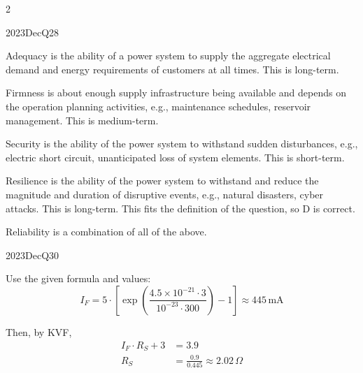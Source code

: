 \begin{multicols}{2}
\begin{qsolution}{2023}{Dec}{Q28}{\tgEE \tgEEPowerSystems}

    \begin{enumualpha}
        \item Adequacy is the ability of a power system to supply the aggregate electrical demand and energy requirements of customers at all times.
            This is long-term.
        \item Firmness is about enough supply infrastructure being available and depends on the operation planning activities, e.g., maintenance schedules, reservoir management.
            This is medium-term.
        \item Security is the ability of the power system to withstand sudden disturbances, e.g., electric short circuit, unanticipated loss of system elements.
            This is short-term.
        \item Resilience is the ability of the power system to withstand and reduce the magnitude and duration of disruptive events, e.g., natural disasters, cyber attacks.
            This is long-term. This fits the definition of the question, so D is correct.
        \item Reliability is a combination of all of the above.
    \end{enumualpha}
\end{qsolution}

\begin{qsolution}{2023}{Dec}{Q30}{\tgEE \tgEECircuitAnalysis}

    Use the given formula and values:
    \[I_F=5\cdot\left[\exp\left(\frac{4.5\times10^{-21}\cdot3}{10^{-23}\cdot300}\right)-1\right]\approx 445\,\mathrm{mA}\]

    Then, by KVF,
    \begin{align*}
        I_F\cdot R_S+3&=3.9\\
        R_S&=\frac{0.9}{0.445}\approx 2.02\,\Omega
    \end{align*}
\end{qsolution}

\end{multicols}

